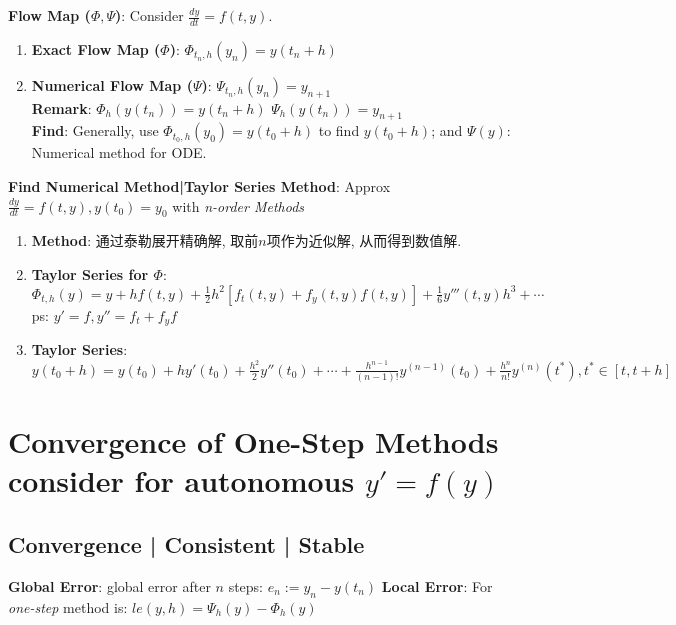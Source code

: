 \documentclass[9pt]{article}
\begin{document}
\textbf{Flow Map ($\Phi,\Psi$)}: Consider $\frac{dy}{dt}=f(t,y)$.

\begin{enumerate}[itemsep=-2pt, topsep=-2pt]
    \item \textbf{Exact Flow Map ($\Phi$)}: $\Phi_{t_n,h}(y_n)=y(t_n+h)$ 
    \item \textbf{Numerical Flow Map ($\Psi$)}: $\Psi_{t_n,h}(y_n)=y_{n+1}$  \\
    \textbf{Remark}: $\Phi_h(y(t_n))=y(t_n+h)$ \quad \quad $\Psi_h(y(t_n))=y_{n+1}$ \\
    \textbf{Find}: Generally, use $\Phi_{t_0,h}(y_0)=y(t_0+h)$ to find $y(t_0+h)$; \quad and $\Psi(y)$: Numerical method for ODE.
\end{enumerate}

\textbf{Find Numerical Method|Taylor Series Method}: {\small Approx $\frac{dy}{dt}=f(t,y),y(t_0)=y_0$ with \textit{n-order Methods}}

\begin{enumerate}[itemsep=-2pt, topsep=-2pt]
    \item \textbf{Method}: {\small 通过泰勒展开精确解, 取前$n$项作为近似解, 从而得到数值解.}
    \item \textbf{Taylor Series for $\Phi$}: $\Phi_{t,h}(y)=y+hf(t,y)+\frac{1}{2}h^2[f_t(t,y)+f_y(t,y)f(t,y)]+\frac{1}{6}y'''(t,y)h^3+\cdots$  {\tiny ps: $y'=f,y''=f_t+f_yf$}
    \item \textbf{Taylor Series}: $y(t_0+h)=y(t_0)+hy'(t_0)+\frac{h^2}{2}y''(t_0)+\cdots+\frac{h^{n-1}}{(n-1)!}y^{(n-1)}(t_0)+\frac{h^n}{n!}y^{(n)}(t^*),t^*\in[t,t+h]$
\end{enumerate}


\section{Convergence of One-Step Methods {\scriptsize consider for autonomous $y'=f(y)$}} %

\subsection{Convergence | Consistent | Stable} %
\textbf{Global Error}: global error after $n$ steps: $e_n:=y_n-y(t_n)$ \quad \textbf{Local Error}: {\small For \textit{one-step} method is: $le(y,h)=\Psi_h(y)-\Phi_h(y)$}
\end{document}
